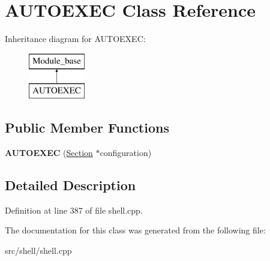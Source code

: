\hypertarget{classAUTOEXEC}{\section{A\-U\-T\-O\-E\-X\-E\-C Class Reference}
\label{classAUTOEXEC}
}
Inheritance diagram for A\-U\-T\-O\-E\-X\-E\-C\-:\begin{figure}[H]
\begin{center}
\leavevmode
\includegraphics[height=2.000000cm]{classAUTOEXEC}
\end{center}
\end{figure}
\subsection*{Public Member Functions}
\begin{DoxyCompactItemize}
\item 
\hypertarget{classAUTOEXEC_a0c36ab7cc15d2e8ed2fc590cafc89672}{{\bfseries A\-U\-T\-O\-E\-X\-E\-C} (\hyperlink{classSection}{Section} $\ast$configuration)}\label{classAUTOEXEC_a0c36ab7cc15d2e8ed2fc590cafc89672}

\end{DoxyCompactItemize}


\subsection{Detailed Description}


Definition at line 387 of file shell.\-cpp.



The documentation for this class was generated from the following file\-:\begin{DoxyCompactItemize}
\item 
src/shell/shell.\-cpp\end{DoxyCompactItemize}
